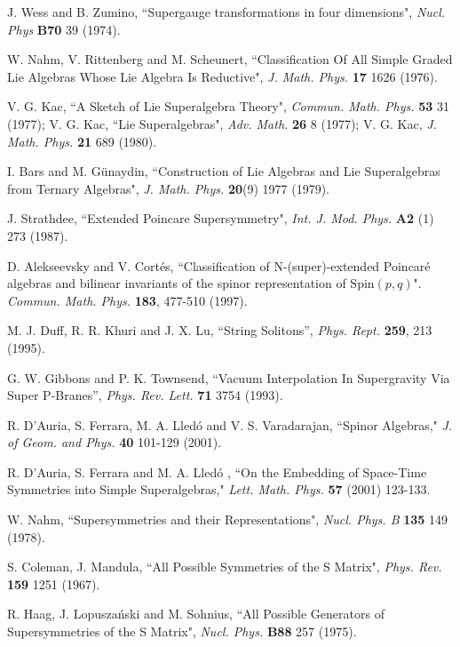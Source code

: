 \documentclass[a4paper,12pt]{article}
\begin{document}
\begin{thebibliography}{99}

 J. Wess and B. Zumino, ``Supergauge transformations
in four dimensions", {\it Nucl. Phys} {\bf B70} 39 (1974).



  W. Nahm, V. Rittenberg and M. Scheunert,
 ``Classification Of All Simple Graded Lie Algebras Whose Lie Algebra Is Reductive",
  {\it J. Math. Phys.} {\bf 17} 1626 (1976).

 V. G. Kac, ``A Sketch of Lie Superalgebra Theory",  {\it Commun. Math. Phys.} {\bf 53} 31 (1977);
V. G. Kac, ``Lie Superalgebras",  {\it Adv. Math. } {\bf 26} 8
(1977); V. G. Kac, {\it J. Math. Phys.} {\bf 21} 689 (1980).

I. Bars and  M. G\"unaydin, ``Construction of
Lie Algebras and Lie Superalgebras from Ternary Algebras",
 {\it J. Math. Phys.} {\bf 20}(9) 1977
 (1979).

  J. Strathdee, ``Extended Poincare Supersymmetry",
 {\it Int. J. Mod. Phys. } {\bf A2} (1) 273 (1987).

    D.  Alekseevsky and V. Cort\'es, ``Classification of N-(super)-extended Poincar\'e
algebras and bilinear invariants of the spinor representation of
Spin$(p,q)$". {\it Commun. Math. Phys.} {\bf 183}, 477-510 (1997).


 M. J. Duff, R. R. Khuri and J. X. Lu,
``String Solitons'', {\it  Phys. Rept.}  {\bf 259}, 213 (1995).

 G. W. Gibbons and P. K. Townsend,
``Vacuum Interpolation In Supergravity Via Super P-Branes'', {\it
Phys.  Rev.  Lett.}  {\bf 71} 3754 (1993).


 R. D'Auria, S. Ferrara,  M. A. Lled\'o and V. S. Varadarajan,
``Spinor Algebras," {\it J. of Geom. and Phys.} {\bf 40} 101-129
(2001).


 R. D'Auria, S. Ferrara and  M. A. Lled\'o , ``On the Embedding of
Space-Time Symmetries into Simple Superalgebras," {\it Lett. Math.
Phys.} {\bf 57} (2001) 123-133.

  W. Nahm, ``Supersymmetries and their Representations",
 {\it Nucl. Phys. B} {\bf 135} 149 (1978).

 S. Coleman, J. Mandula, ``All Possible Symmetries of the S Matrix",
 {\it Phys. Rev.} {\bf 159} 1251 (1967).

  R. Haag, J. Lopusza\'nski and M. Sohnius,
``All Possible Generators of Supersymmetries of the S Matrix",
{\it Nucl. Phys.} {\bf B88} 257 (1975).


\end{thebibliography}
\end{document}
